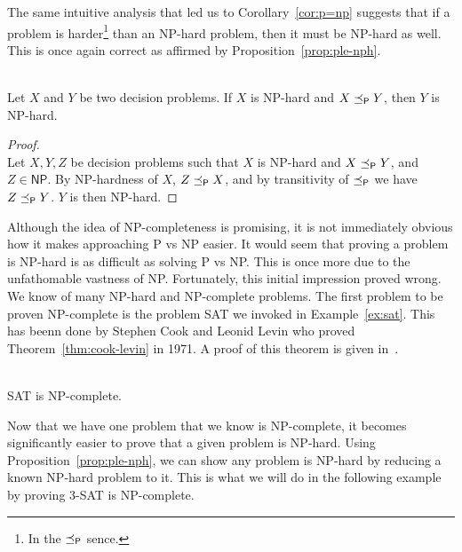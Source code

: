 The same intuitive analysis that led us to Corollary~\ref{cor:p=np} suggests that if a problem is harder\footnote{In the \(\preceq_\textsf{P}\) sence.} than an \textsf{NP}-hard problem, then it must be \textsf{NP}-hard as well. This is once again correct as affirmed by Proposition~\ref{prop:ple-nph}.

\begin{proposition}\ \\
    \label{prop:ple-nph}
    Let \(X\) and \(Y\) be two decision problems. If \(X\) is \textsf{NP}-hard and \(X\preceq_\textsf{P} Y\), then \(Y\) is \textsf{NP}-hard.
\end{proposition}

\begin{proof}\ \\
    Let \(X, Y, Z\) be decision problems such that \(X\) is \textsf{NP}-hard and \(X\preceq_\textsf{P} Y\), and \(Z \in\textsf{NP}\). By  \textsf{NP}-hardness of \(X\), \(Z \preceq_\textsf{P} X\), and by transitivity of \(\preceq_\textsf{P}\) we have \(Z \preceq_\textsf{P} Y\). \(Y\) is then \textsf{NP}-hard.
\end{proof}

Although the idea of \textsf{NP}-completeness is promising, it is not immediately obvious how it makes approaching \textsf{P} vs \textsf{NP} easier. It would seem that proving a problem is \textsf{NP}-hard is as difficult as solving \textsf{P} vs \textsf{NP}. This is once more due to the unfathomable vastness of \textsf{NP}. Fortunately, this initial impression proved wrong. We know of many \textsf{NP}-hard and \textsf{NP}-complete problems. The first problem to be proven \textsf{NP}-complete is the problem \textsf{SAT} we invoked in Example~\ref{ex:sat}. This has beenn done by Stephen Cook and Leonid Levin who proved Theorem~\ref{thm:cook-levin} in 1971. A proof of this theorem is given in~\cite{langages-formels}.

\begin{theorem}\ \\
    \label{thm:cook-levin}
    \textsf{SAT} is \textsf{NP}-complete.
\end{theorem}

Now that we have one problem that we know is \textsf{NP}-complete, it becomes significantly easier to prove that a given problem is \textsf{NP}-hard. Using Proposition~\ref{prop:ple-nph}, we can show any problem is \textsf{NP}-hard by reducing a known \textsf{NP}-hard problem to it. This is what we will do in the following example by proving 3-\textsf{SAT} is \textsf{NP}-complete.


